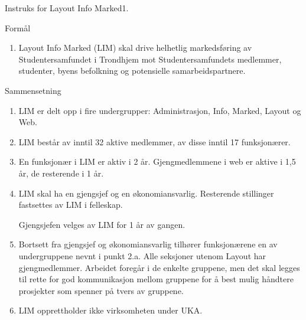 
\begin{instruks}{Instruks for Layout Info Marked}{1. }{ }

    \begin{instruksledd}{Formål}
        \begin{enumerate}
            \item Layout Info Marked (LIM) skal drive helhetlig markedsføring av Studentersamfundet
                i Trondhjem mot
                Studentersamfundets medlemmer, studenter, byens befolkning og potensielle samarbeidspartnere.
        \end{enumerate}
    \end{instruksledd}

    \begin{instruksledd}{Sammensetning}
        \begin{enumerate}
            \item LIM er delt opp i fire undergrupper: Administrasjon, Info, Marked, Layout og Web.
            \item LIM består av inntil 32 aktive medlemmer, av disse inntil 17 funksjonærer.
            \item En funksjonær i LIM er aktiv i 2 år. Gjengmedlemmene i web er aktive i 1,5 år, de
                resterende i 1 år.
            \item LIM skal ha en gjengsjef og en økonomiansvarlig. Resterende stillinger fastsettes
                av LIM i felleskap.

                Gjengsjefen velges av LIM for 1 år av gangen.
            \item Bortsett fra gjengsjef og
                økonomiansvarlig tilhører funksjonærene en av undergruppene nevnt i punkt 2.a.
                Alle
                seksjoner utenom Layout har gjengmedlemmer. Arbeidet foregår i de enkelte gruppene, men det skal
                legges til
                rette for god kommunikasjon mellom gruppene for å best mulig håndtere prosjekter som spenner på
                tvers av
                gruppene.
            \item LIM opprettholder ikke virksomheten under UKA.
        \end{enumerate}
    \end{instruksledd}


\end{instruks}
